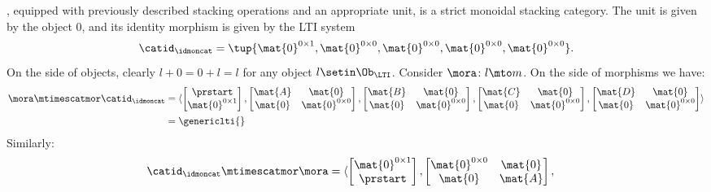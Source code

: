 \begin{example}
    \LTI, equipped with previously described stacking operations and an appropriate unit, is a strict monoidal stacking category.
    The unit is given by the object 0, and its identity morphism is given by the LTI system
    \begin{equation*}
        \catid_\idmoncat=\tup{\mat{0}^{0\times 1}, \mat{0}^{0\times 0}, \mat{0}^{0\times 0}, \mat{0}^{0\times 0},\mat{0}^{0\times 0}}.
    \end{equation*}
    On the side of objects, clearly $l+0=0+l=l$ for any object $l\setin \Ob_\LTI$.
    Consider $\mora\colon l\mto m$.
    On the side of morphisms we have:
    \begin{equation*}
        \begin{aligned}
            \mora \mtimescatmor \catid_\idmoncat & =
            \langle\begin{bmatrix}\prstart \\ \mat{0}^{0\times 1}\end{bmatrix},
            \begin{bmatrix}\mat{A}&\mat{0}\\ \mat{0}&\mat{0}^{0\times 0}\end{bmatrix},
            \begin{bmatrix}\mat{B}&\mat{0}\\ \mat{0}&\mat{0}^{0\times 0}\end{bmatrix},
            \begin{bmatrix}\mat{C}&\mat{0}\\ \mat{0}&\mat{0}^{0\times 0}\end{bmatrix},
            \begin{bmatrix}\mat{D}&\mat{0}\\ \mat{0}&\mat{0}^{0\times 0}\end{bmatrix}\rangle \\
                                                 & =\genericlti{}
        \end{aligned}
    \end{equation*}
    Similarly:
    \begin{equation*}
        \begin{aligned}
            \catid_\idmoncat \mtimescatmor \mora & =
            \langle\begin{bmatrix}\mat{0}^{0\times 1}\\ \prstart\end{bmatrix},
            \begin{bmatrix}\mat{0}^{0\times 0}&\mat{0}\\\mat{0}&\mat{A}\end{bmatrix},

\end{aligned}
\end{equation*}
\end{example}
